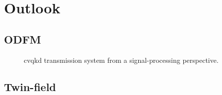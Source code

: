\section{Outlook}

\subsection{ODFM}

\begin{figure}[htb]
	\centering
	
	\caption{\Gls{cvqkd} transmission system from a signal-processing perspective.}
\end{figure}

\subsection{Twin-field}
